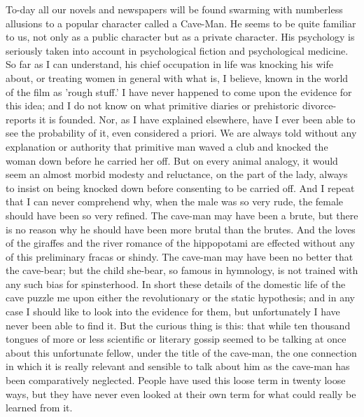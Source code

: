 To-day all our novels and newspapers will be found swarming with numberless allusions to a popular character called a Cave-Man. He seems to be quite familiar to us, not only as a public character but as a private character. His psychology is seriously taken into account in psychological fiction and psychological medicine. So far as I can understand, his chief occupation in life was knocking his wife about, or treating women in general with what is, I believe, known in the world of the film as 'rough stuff.' I have never happened to come upon the evidence for this idea; and I do not know on what primitive diaries or prehistoric divorce-reports it is founded. Nor, as I have explained elsewhere, have I ever been able to see the probability of it, even considered a priori. We are always told without any explanation or authority that primitive man waved a club and knocked the woman down before he carried her off. But on every animal analogy, it would seem an almost morbid modesty and reluctance, on the part of the lady, always to insist on being knocked down before consenting to be carried off. And I repeat that I can never comprehend why, when the male was so very rude, the female should have been so very refined. The cave-man may have been a brute, but there is no reason why he should have been more brutal than the brutes. And the loves of the giraffes and the river romance of the hippopotami are effected without any of this preliminary fracas or shindy. The cave-man may have been no better that the cave-bear; but the child she-bear, so famous in hymnology, is not trained with any such bias for spinsterhood. In short these details of the domestic life of the cave puzzle me upon either the revolutionary or the static hypothesis; and in any case I should like to look into the evidence for them, but unfortunately I have never been able to find it. But the curious thing is this: that while ten thousand tongues of more or less scientific or literary gossip seemed to be talking at once about this unfortunate fellow, under the title of the cave-man, the one connection in which it is really relevant and sensible to talk about him as the cave-man has been comparatively neglected. People have used this loose term in twenty loose ways, but they have never even looked at their own term for what could really be learned from it.

